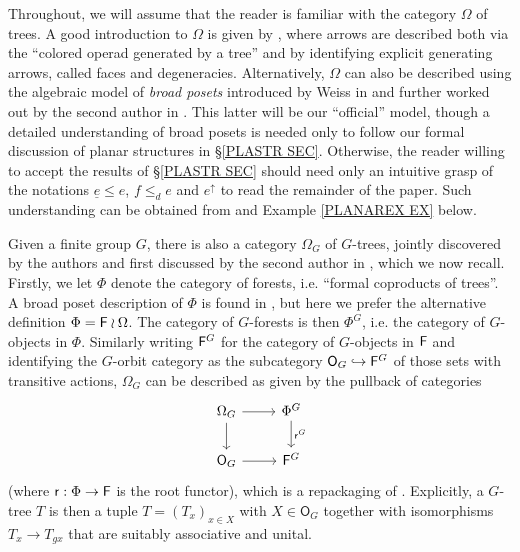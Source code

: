 \documentclass[a4paper,10pt]{article}%
\begin{document}
Throughout, we will assume that the reader is familiar with the category $\Omega$ of trees.
A good introduction to $\Omega$ is given by 
\cite[\S 3]{MW07}, where arrows are described both via 
the ``colored operad generated by a tree''  and by identifying explicit generating arrows, called faces and degeneracies.
Alternatively, $\Omega$ can also be described 
using the algebraic model of 
\textit{broad posets}
introduced by Weiss in \cite{We12} and further worked out by the second author in \cite[\S 5]{Pe17}.
This latter will be our ``official'' model,
though a detailed understanding of broad posets is needed only
to follow our formal discussion of planar structures in \S \ref{PLASTR SEC}.
Otherwise, the reader willing to accept the results of \S \ref{PLASTR SEC} should 
need only an intuitive grasp of the notations 
$\underline{e} \leq e$,
$f \leq_d e$ and $e^{\uparrow}$
to read the remainder of the paper.
Such understanding can be obtained from 
\cite[Example 5.10]{Pe17}
and Example \ref{PLANAREX EX} below.


Given a finite group $G$, there is also a category $\Omega_G$
of $G$-trees, jointly discovered by the authors and first discussed by the second author in 
\cite[\S 4.3,\S 5.3]{Pe17}, which we now recall.
Firstly, we let $\Phi$ denote the category of forests, i.e.
``formal coproducts of trees''.
A broad poset description of $\Phi$ is found in \cite[\S 5.2]{Pe17},
but here we prefer the alternative definition $\Phi = \mathsf{F} \wr \Omega$.
The category of $G$-forests is then 
$\Phi^G$, i.e. the category of $G$-objects in $\Phi$. 
Similarly writing
$\mathsf{F}^G$ for the category of $G$-objects in $\mathsf{F}$ and
identifying the $G$-orbit category as the subcategory
$\mathsf{O}_G \hookrightarrow \mathsf{F}^G$
of those sets with transitive actions, $\Omega_G$ can be described as given by the pullback of categories
\begin{equation}\label{OGDEF EQ}
\begin{tikzcd}
	\Omega_G \ar{r} \ar{d} & 
	\Phi^G \arrow{d}{\mathsf{r}^G}
\\
	\mathsf{O}_G \ar{r} & \Fin^G
\end{tikzcd}
\end{equation}
(where $\mathsf{r}: \Phi \to \mathsf{F}$ is the root functor),
which is a repackaging of \cite[Prop. 5.46]{Pe17}.
Explicitly, a $G$-tree $T$ is then a tuple 
$T = (T_x)_{x \in X}$ with $X \in \mathsf{O}_G$
together with isomorphisms
$T_x \to T_{g x}$ that are suitably associative and unital.
\end{document}
